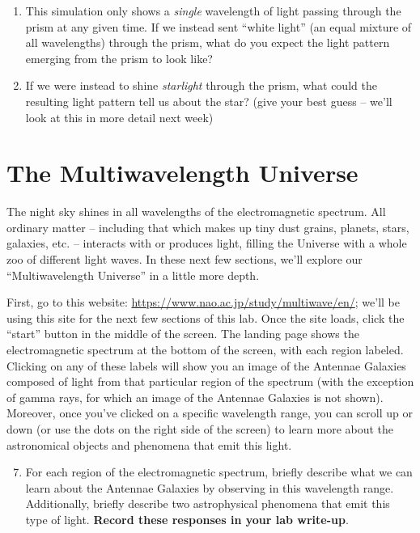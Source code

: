 \documentclass[11pt]{article}
\begin{document}
\begin{enumerate}
\begin{enumerate}
        \item This simulation only shows a \emph{single} wavelength of light passing through the prism at any given time. If we instead sent ``white light'' (an equal mixture of all wavelengths) through the prism, what do you expect the light pattern emerging from the prism to look like? 
        
        \item If we were instead to shine \emph{starlight} through the prism, what could the resulting light pattern tell us about the star? (give your best guess -- we'll look at this in more detail next week)
        
    \end{enumerate}
\end{enumerate}


\bigskip

\section{The Multiwavelength Universe}
The night sky shines in all wavelengths of the electromagnetic spectrum. All ordinary matter -- including that which makes up tiny dust grains, planets, stars, galaxies, etc. -- interacts with or produces light, filling the Universe with a whole zoo of different light waves. In these next few sections, we'll explore our ``Multiwavelength Universe'' in a little more depth.

\bigskip

First, go to this website: \url{https://www.nao.ac.jp/study/multiwave/en/}; we'll be using this site for the next few sections of this lab. Once the site loads, click the ``start'' button in the middle of the screen. The landing page shows the electromagnetic spectrum at the bottom of the screen, with each region labeled. Clicking on any of these labels will show you an image of the Antennae Galaxies composed of light from that particular region of the spectrum (with the exception of gamma rays, for which an image of the Antennae Galaxies is not shown). Moreover, once you've clicked on a specific wavelength range, you can scroll up or down (or use the dots on the right side of the screen) to learn more about the astronomical objects and phenomena that emit this light.
 
\bigskip
\begin{enumerate}
    \setcounter{enumi}{6}
    \item For each region of the electromagnetic spectrum, briefly describe what we can learn about the Antennae Galaxies by observing in this wavelength range. Additionally, briefly describe two astrophysical phenomena that emit this type of light. \textbf{Record these responses in your lab write-up}.
\end{enumerate}
\bigskip
\end{document}
